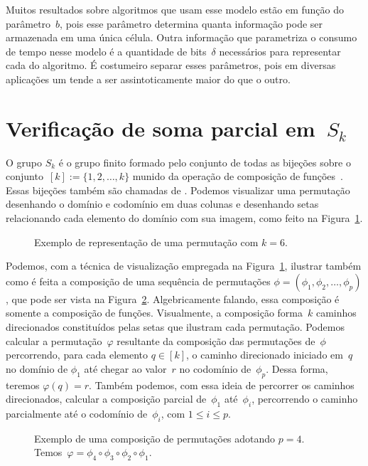 Muitos resultados sobre algoritmos que usam esse modelo estão em função do parâmetro~$b$, pois esse parâmetro determina quanta informação pode ser armazenada em uma única célula. Outra informação que parametriza o consumo de tempo nesse modelo é a quantidade de bits~$\delta$ necessários para representar cada  do algoritmo. É costumeiro separar esses parâmetros, pois em diversas aplicações um tende a ser assintoticamente maior do que o outro.

\section{Verificação de soma parcial em~$S_k$}

O grupo $S_k$ é o grupo finito formado pelo conjunto de todas as bijeções sobre o conjunto~${[k]:=\{1,2,\ldots,k\}}$ munido da operação de composição de funções~\cite{agozine2010}. Essas bijeções também são chamadas de . Podemos visualizar uma permutação desenhando o domínio e codomínio em duas colunas e desenhando setas relacionando cada elemento do domínio com sua imagem, como feito na Figura~\ref{fig:LIM-exemplo-uma-perm}.

\begin{figure}[htb]
\centering

\caption{Exemplo de representação de uma permutação com $k=6$.}
\label{fig:LIM-exemplo-uma-perm}
\end{figure}

Podemos, com a técnica de visualização empregada na Figura~\ref{fig:LIM-exemplo-uma-perm}, ilustrar também como é feita a composição de uma sequência de permutações ${\phi=(\phi_1, \phi_2, \ldots, \phi_p)}$, que pode ser vista na Figura~\ref{fig:LIM-exemplo-comp}. Algebricamente falando, essa composição é somente a composição de funções. Visualmente, a composição forma~$k$ caminhos direcionados constituídos pelas setas que ilustram cada permutação. Podemos calcular a permutação~$\varphi$ resultante da composição das permutações de~$\phi$ percorrendo, para cada elemento $q\in [k]$, o caminho direcionado iniciado em~$q$ no domínio de $\phi_1$ até chegar ao valor~$r$ no codomínio de~$\phi_p$. Dessa forma, teremos $\varphi(q)=r$. Também podemos, com essa ideia de percorrer os caminhos direcionados, calcular a composição parcial de~$\phi_1$ até~$\phi_i$, percorrendo o caminho parcialmente até o codomínio de~$\phi_i$, com $1\leqslant i \leqslant p$.

\begin{figure}[htb]
\centering

\caption{Exemplo de uma composição de permutações adotando $p=4$. Temos~$\varphi = \phi_4\circ \phi_3\circ \phi_2\circ \phi_1$.}
\label{fig:LIM-exemplo-comp}
\end{figure}

